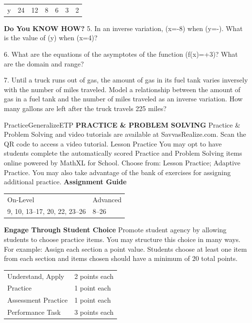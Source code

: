 \documentclass{article}
\newenvironment{concept-summary}{}{}    %
\newenvironment{te-addendum}[2]{}{}     %
\newcommand{\answer}[1]{}               %
\newcommand{\placeholder}[2]{}          %
\begin{document}
\begin{concept-summary}
\begin{tabular}{lrrrrrr}
y & 24 & 12 & 8 & 6 & 3 & 2 \\
\end{tabular}
\answer{The product of (x) and (y) is not constant. (It is 32 in one column and 24 in the others.)}
\textbf{Do You KNOW HOW?}
5. In an inverse variation, (x=-8) when (y=-). What is the value of (y) when (x=4)?
\answer{When (x=4), (y=\frac{1}{2}).}
6. What are the equations of the asymptotes of the function (f(x)=+3)? What are the domain and range?
\answer{vertical asymptote: (x=5); horizontal asymptote: (y=3); domain: the set of real numbers with (x\neq5); range: the set of real numbers with (y\neq3)}
7. Until a truck runs out of gas, the amount of gas in its fuel tank varies inversely with the number of miles traveled. Model a relationship between the amount of gas in a fuel tank and the number of miles traveled as an inverse variation. How many gallons are left after the truck travels 225 miles?
\placeholder{illustration}{Two blue trucks on diagonal gray road through tan and green countryside. Upper-left truck callout g gal left after225 mi; lower-right truck 9 gal left after135 mi.}
\answer{(y=\frac{1,215}{x}); 5.4 gallons left after 225 mi.}
\end{concept-summary}
\begin{te-addendum}{Practice}{GeneralizeETP}
\textbf{PRACTICE \& PROBLEM SOLVING}
Practice \& Problem Solving and video tutorials are available at SavvasRealize.com. Scan the QR code to access a video tutorial.
Lesson Practice You may opt to have students complete the automatically scored Practice and Problem Solving items online powered by MathXL for School.
Choose from: Lesson Practice; Adaptive Practice.
You may also take advantage of the bank of exercises for assigning additional practice.
\textbf{Assignment Guide}
\begin{tabular}{ll}
On-Level & Advanced \\
9, 10, 13--17, 20, 22, 23--26 & 8--26 \\
\end{tabular}
\textbf{Engage Through Student Choice}
Promote student agency by allowing students to choose practice items. You may structure this choice in many ways.
For example:
Assign each section a point value. Students choose at least one item from each section and items chosen should have a minimum of 20 total points.
\begin{tabular}{ll}
Understand, Apply & 2 points each \\
Practice & 1 point each \\
Assessment Practice & 1 point each \\
Performance Task & 3 points each \\
\end{tabular}
\end{te-addendum}
\end{document}
